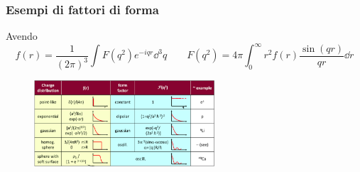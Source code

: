 \subsubsection{Esempi di fattori di forma}
Avendo
\begin{equation*}
f(r)=\frac1{(2\pi)^3}\int F(q^2)e^{-iqr}\dd^3q\qquad F(q^2)=4\pi\int_0^\infty r^2f(r)\frac{\sin(qr)}{qr}\dd r
\end{equation*}
\begin{figure}[H]
    \centering
    \includegraphics[width=0.6\textwidth]{immagini/fig_factor_form_example.png}
\end{figure}
